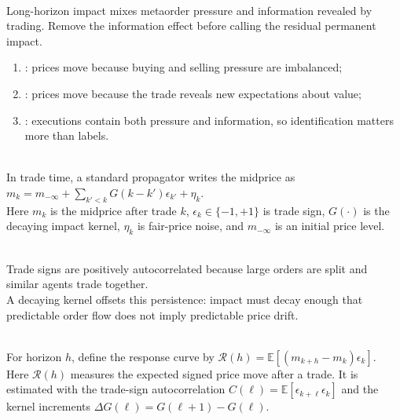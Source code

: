 \documentclass[a4paper,oneside,openany]{book}
\begin{document}
\begin{principle} \\
Long-horizon impact mixes metaorder pressure and information revealed by trading. Remove the information effect before calling the residual permanent impact.
\end{principle}

\begin{taxonomy} 
\begin{enumerate}[label=\roman*.]
\setlength{\itemsep}{0pt}
\item {}: prices move because buying and selling pressure are imbalanced;
\item {}: prices move because the trade reveals new expectations about value;
\item {}: executions contain both pressure and information, so identification matters more than labels.
\end{enumerate}
\end{taxonomy}

\begin{model} \\
In trade time, a standard propagator writes the midprice as $m_k=m_{-\infty}+\sum\limits_{k'<k}G(k-k')\epsilon_{k'}+\eta_k$.\\
Here $m_k$ is the midprice after trade $k$, $\epsilon_k\in\{-1,+1\}$ is trade sign, $G(\cdot)$ is the decaying impact kernel, $\eta_k$ is fair-price noise, and $m_{-\infty}$ is an initial price level.
\end{model}

\begin{mechanism} \\
Trade signs are positively autocorrelated because large orders are split and similar agents trade together.\\
A decaying kernel offsets this persistence: impact must decay enough that predictable order flow does not imply predictable price drift.
\end{mechanism}

\begin{model} \\
For horizon $h$, define the response curve by $\mathcal{R}(h)=\mathbb{E}[(m_{k+h}-m_k)\epsilon_k]$.\\
Here $\mathcal{R}(h)$ measures the expected signed price move after a trade. It is estimated with the trade-sign autocorrelation $C(\ell)=\mathbb{E}[\epsilon_{k+\ell}\epsilon_k]$ and the kernel increments $\Delta G(\ell)=G(\ell+1)-G(\ell)$.
\end{model}
\end{document}
